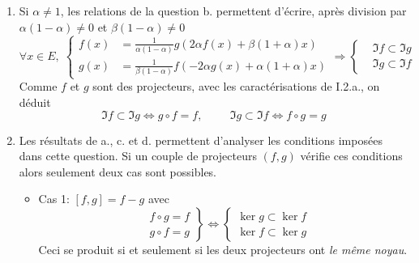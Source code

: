 \begin{enumerate}
\begin{enumerate}
  \item Si $\alpha \neq 1$, les relations de la question b. permettent d'écrire, après division par $\alpha(1-\alpha)\neq 0$ et $\beta(1-\alpha)\neq 0$
\begin{displaymath}
\forall x\in E,\;
\left\lbrace 
\begin{aligned}
  f(x) &= \frac{1}{\alpha(1-\alpha)}g\left( 2\alpha f(x) +\beta(1+\alpha)x\right) \\
  g(x) &= \frac{1}{\beta(1-\alpha)}f\left( -2\alpha g(x) +\alpha(1+\alpha)x\right)
\end{aligned}
\right. 
\Rightarrow
\left\lbrace 
\begin{aligned}
  &\Im f \subset \Im g  \\
  &\Im g \subset \Im f 
\end{aligned}
\right. 
\end{displaymath}
Comme $f$ et $g$ sont des projecteurs, avec les caractérisations de I.2.a., on déduit
\begin{displaymath}
  \Im f \subset \Im g \Leftrightarrow g\circ f = f , \hspace{1cm}
  \Im g \subset \Im f \Leftrightarrow f\circ g = g 
\end{displaymath}

  \item Les résultats de a., c. et d. permettent d'analyser les conditions imposées dans cette question. Si un couple de projecteurs $(f,g)$ vérifie ces conditions alors seulement deux cas sont possibles.
\begin{itemize}
  \item Cas 1: $[f,g]= f-g$ avec 
\begin{displaymath}
\left. 
\begin{aligned}
  &f\circ g = f \\ &g\circ f = g
\end{aligned}
\right\rbrace 
\Leftrightarrow
\left\lbrace 
\begin{aligned}
  \ker g \subset \ker f \\ \ker f \subset \ker g 
\end{aligned}
\right. 
\end{displaymath}
Ceci se produit si et seulement si les deux projecteurs ont \emph{le même noyau}.  


\end{itemize}
\end{enumerate}
\end{enumerate}
